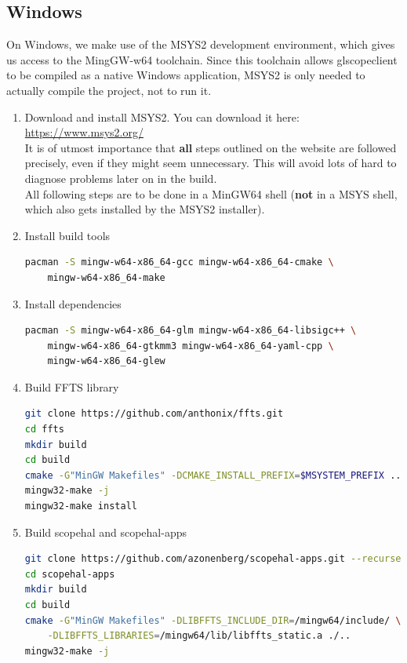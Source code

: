 \subsection{Windows}

On Windows, we make use of the MSYS2 development environment, which gives us access to the MingGW-w64 toolchain. Since this toolchain allows glscopeclient to be compiled as a native Windows application, MSYS2 is only needed to actually compile the project, not to run it.

\begin{enumerate}

\item Download and install MSYS2. You can download it here: \url{https://www.msys2.org/}\\
It is of utmost importance that \textbf{all} steps outlined on the website are followed precisely, even if they might seem unnecessary. This will avoid lots of hard to diagnose problems later on in the build.\\

All following steps are to be done in a MinGW64 shell (\textbf{not} in a MSYS shell, which also gets installed by the MSYS2 installer).

\item Install build tools
\begin{lstlisting}[language=sh]
pacman -S mingw-w64-x86_64-gcc mingw-w64-x86_64-cmake \
    mingw-w64-x86_64-make
\end{lstlisting}

\item Install dependencies
\begin{lstlisting}[language=sh]
pacman -S mingw-w64-x86_64-glm mingw-w64-x86_64-libsigc++ \
    mingw-w64-x86_64-gtkmm3 mingw-w64-x86_64-yaml-cpp \
    mingw-w64-x86_64-glew
\end{lstlisting}

\item Build FFTS library
\begin{lstlisting}[language=sh]
git clone https://github.com/anthonix/ffts.git
cd ffts
mkdir build
cd build
cmake -G"MinGW Makefiles" -DCMAKE_INSTALL_PREFIX=$MSYSTEM_PREFIX ..
mingw32-make -j
mingw32-make install
\end{lstlisting}

\item Build scopehal and scopehal-apps
\begin{lstlisting}[language=sh]
git clone https://github.com/azonenberg/scopehal-apps.git --recurse-submodules
cd scopehal-apps
mkdir build
cd build
cmake -G"MinGW Makefiles" -DLIBFFTS_INCLUDE_DIR=/mingw64/include/ \
    -DLIBFFTS_LIBRARIES=/mingw64/lib/libffts_static.a ./..
mingw32-make -j
\end{lstlisting}


\end{enumerate}
